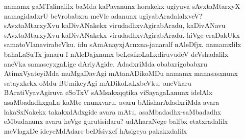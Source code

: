 \hbox{namamx} gaMTalinalilx baMda kaPavanunx horakekx ugiyuva sAvxtaMtarxyX namagidadxrU beVrobabxra meVle adanunx ugiyabAradalalxveV? sAvxtaMtarxyXvu kaDivANakekx virudadhxvAgirabAradu, kaDivANavu sAvxtaMtarxyXvu kaDivANakekx virudadhxvAgirabAradu. hiVge eraDakUkx samatoVlanavirabeVku. idu sAmAnayxjAcnxna-janaralf nAleDfjx. namamxlilx bahaLaSuTx janaru I nAleDajxnunx beLesikoLaLxdiruvudeV deVshadalilx aneVka samaseyxgaLige dAriyAgide. AdadxriMda obabxrigobabxru AtimxVyateyiMda muMgaDavAgi mAtanADikoMDu namamx manasasxnunx satayxkekx oMdu BUmikeyAgi mADikoLaLxbeVku. aneVkaru BAratiVyavAgiruva eSoTxV sAMsakxqqtika viSayagaLanunx idelAlx asaMbadadhxgaLa kaMte enunxvaru. avaru bAlisharAdadxriMda avara lakaSxNakekx takakxdAdxgide avara mAtu. asaMbadadhx-saMbadadhx eMbudanunx avaru heVge gurutisidaru? udAharaNege balfbx etatxradalilx meVlagxDe ideyeMdAdare beDfsivxcf hAsigeya pakakxdalilx 

